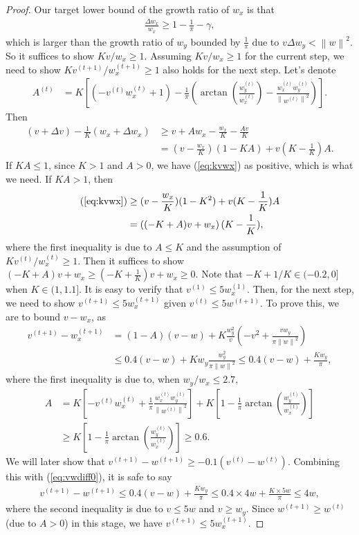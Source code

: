 \documentclass{article}
\theoremstyle{plain}
\theoremstyle{remark}
\newcommand{\norm}[1]{\left\lVert#1\right\rVert}
\newcommand{\T}[1]{^{(#1)}}
\def\t{^{(t)}}
\def\tt{^{(t+1)}}
\begin{document}
\begin{proof}
Our target lower bound of the growth ratio of $w_x$ is that 
\begin{align}
    \frac{\Delta w_x}{w_x} \ge 1-\frac{1}{\pi}-\gamma, \label{eq:ratiowx}
\end{align}
which is larger than the growth ratio of $w_y$ bounded by $\frac{1}{\pi}$ due to $v\Delta w_y < \norm{w}^2$.
So it suffices to show $Kv/w_x\ge 1$. Assuming $Kv/w_x\ge 1$ for the current step, we need to show $Kv\tt/w_x\tt\ge 1$ also holds for the next step. Let's denote 
\begin{align}
    A\t &= K\left[(-v\t w_x\t + 1) - \frac{1}{\pi}\left(\arctan{\left(\frac{w_y\t}{w_x\t}\right)}-\frac{w_x\t w_y\t}{\norm{w\t}^2}\right)\right].
\end{align}
Then 
\begin{align}
    (v+\Delta v)-\frac{1}{K}(w_x+\Delta w_x) &\ge v+A w_x - \frac{w_x}{K}-\frac{A v}{K} \nonumber \\
    & = (v-\frac{w_x}{K})(1-KA)+v(K-\frac{1}{K})A. \label{eq:kvwx}
\end{align}
If $KA\le 1$, since $K>1$ and $A>0$, we have (\ref{eq:kvwx}) as positive, which is what we need. If $KA>1$, then
\begin{align*}
    (\ref{eq:kvwx}) &\ge (v-\frac{w_x}{K})(1-K^2)+v(K-\frac{1}{K})A \\
    &= \left((-K+A)v+w_x\right)(K-\frac{1}{K}),
\end{align*}
where the first inequality is due to $A\le K$ and the assumption of $Kv\t/w_x\t\ge 1$. Then it suffices to show $(-K+A)v+w_x\ge (-K+\frac{1}{K})v+w_x\ge0$. Note that $-K+1/K\in(-0.2,0]$ when $K\in(1,1.1]$. It is easy to verify that $v\T{1}\le 5w_x\T{1}$. Then, for the next step, we need to show $v\tt\le 5w_x\tt$ given $v\t\le 5w\tt$. To prove this, we are to bound $v-w_x$, as
\begin{align}
    v\tt - w_x\tt &= (1 - A)(v-w) + K\frac{w_y^2}{v}(-v^2+\frac{v w_y}{\pi\norm{w}^2}) \nonumber \\
    & \le 0.4(v-w)+Kw_y\frac{w_y^2}{\pi\norm{w}^2}\le 0.4(v-w)+\frac{Kw_y}{\pi}, \label{eq:vwdiff0}
\end{align}
where the first inequality is due to, when $w_y/w_x\le 2.7$,
\begin{align*}
    A 
    &= K\left[-v\t w_x\t +\frac{1}{\pi}\frac{w_x\t w_y\t}{\norm{w\t}^2}\right] + K\left[1 - \frac{1}{\pi}\arctan{\left(\frac{w_y\t}{w_x\t}\right)}\right]\\
    &\ge K\left[1 - \frac{1}{\pi}\arctan{\left(\frac{w_y\t}{w_x\t}\right)}\right] \ge 0.6.
\end{align*}
We will later show that $v\tt-w\tt\ge -0.1(v\t-w\t)$. Combining this with (\ref{eq:vwdiff0}), it is safe to say 
\begin{align*}
    v\tt-w\tt \le 0.4(v-w)+\frac{Kw_y}{\pi}\le 0.4\times 4w+\frac{K\times 5w}{\pi} \le  4w,
\end{align*}
where the second inequality is due to $v\le 5w$ and $v\ge w_y$. Since $w\tt\ge w\t$ (due to $A>0$) in this stage, we have $v\tt\le 5w_x\tt$.


\end{proof}
\end{document}
